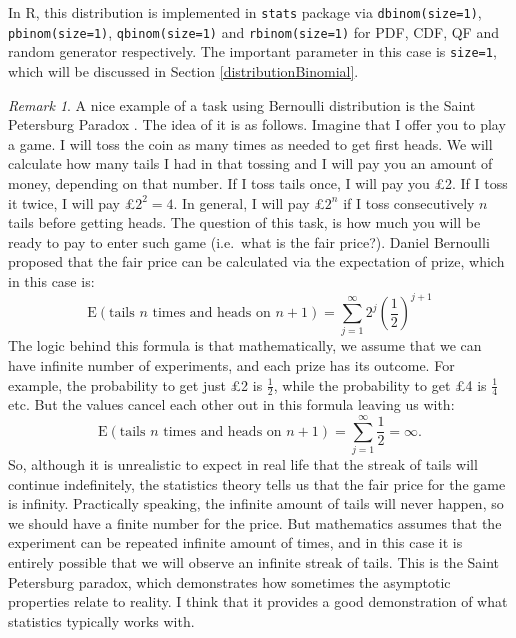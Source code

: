 \documentclass[
]{book}
\theoremstyle{definition}
\theoremstyle{definition}
\theoremstyle{definition}
\theoremstyle{definition}
\theoremstyle{remark}
\newtheorem*{remark}{Remark}
\begin{document}
In R, this distribution is implemented in \texttt{stats} package via \texttt{dbinom(size=1)}, \texttt{pbinom(size=1)}, \texttt{qbinom(size=1)} and \texttt{rbinom(size=1)} for PDF, CDF, QF and random generator respectively. The important parameter in this case is \texttt{size=1}, which will be discussed in Section \ref{distributionBinomial}.

\begin{remark}
A nice example of a task using Bernoulli distribution is the Saint Petersburg Paradox \citep[8318]{Kotz2005}. The idea of it is as follows. Imagine that I offer you to play a game. I will toss the coin as many times as needed to get first heads. We will calculate how many tails I had in that tossing and I will pay you an amount of money, depending on that number. If I toss tails once, I will pay you £2. If I toss it twice, I will pay £\(2^2=4\). In general, I will pay £\(2^n\) if I toss consecutively \(n\) tails before getting heads. The question of this task, is how much you will be ready to pay to enter such game (i.e.~what is the fair price?). Daniel Bernoulli proposed that the fair price can be calculated via the expectation of prize, which in this case is:
\begin{equation*}
    \mathrm{E}(\text{tails }n\text{ times and heads on }n+1) = \sum_{j=1}^\infty 2^{j} \left(\frac{1}{2}\right)^{j+1} 
\end{equation*}
The logic behind this formula is that mathematically, we assume that we can have infinite number of experiments, and each prize has its outcome. For example, the probability to get just £2 is \(\frac{1}{2}\), while the probability to get £4 is \(\frac{1}{4}\) etc. But the values cancel each other out in this formula leaving us with:
\begin{equation*}
    \mathrm{E}(\text{tails }n\text{ times and heads on }n+1) = \sum_{j=1}^\infty \frac{1}{2} = \infty .
\end{equation*}
So, although it is unrealistic to expect in real life that the streak of tails will continue indefinitely, the statistics theory tells us that the fair price for the game is infinity. Practically speaking, the infinite amount of tails will never happen, so we should have a finite number for the price. But mathematics assumes that the experiment can be repeated infinite amount of times, and in this case it is entirely possible that we will observe an infinite streak of tails. This is the Saint Petersburg paradox, which demonstrates how sometimes the asymptotic properties relate to reality. I think that it provides a good demonstration of what statistics typically works with.
\end{remark}
\end{document}
